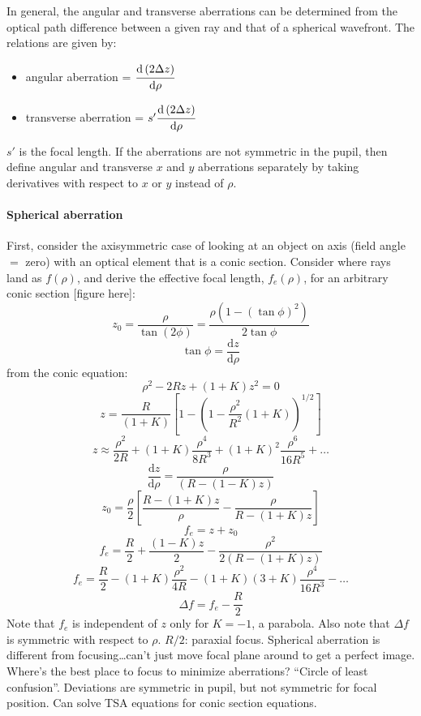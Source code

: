 \documentclass[12pt]{article}
\newcommand{\mynotes}[1]{\textcolor{myBlue}{#1}}
\begin{document}
In general, the angular and transverse aberrations can be determined
from the optical path difference between a given ray and that of a
spherical wavefront. The relations are given by:
\begin{itemize}
    \item angular aberration =
        $\cfrac{\mathrm{d} \left( 2\Delta{z} \right) }{\mathrm{d}\rho}$
    \item transverse aberration =
        $s'\cfrac{\mathrm{d} \left( 2\Delta{z} \right) }{\mathrm{d}\rho}$
\end{itemize}
$s'$ is the focal length. If the aberrations are not symmetric in the pupil,
then define angular and transverse $x$ and $y$ aberrations separately by taking
derivatives with respect to $x$ or $y$ instead of $\rho$.

\paragraph{Spherical aberration}
First, consider the axisymmetric case of looking at an object on axis
(field angle $=$ zero) with an optical element that is a conic
section. Consider where rays land as $f(\rho)$, and derive
the effective focal length, $f_{e}(\rho)$, for an arbitrary conic
section [figure here]:
\[
    z_{0} = \frac{\rho}{\tan(2\phi)} = \frac{\rho(1-(\tan\phi)^{2})}{2\tan\phi}
    \]
\[
    \tan\phi = \frac{\mathrm{d}z}{\mathrm{d}\rho}
    \]
from the conic equation:
\[
    \rho^{2} - 2Rz + (1+K)z^{2} = 0
    \]
\[
    z = \frac{R}{(1+K)} \left[ 1 - \left( 1 - \frac{\rho^{2}}{R^{2}}
    \left( 1 + K \right) \right) ^{1/2} \right]
    \]
\[
    z \approx \frac{\rho^{2}}{2R} + (1 + K)\frac{\rho^{4}}{8R^{3}} +
    (1+K)^{2}\frac{\rho^{6}}{16R^{5}} + \ldots
    \]
\[
    \frac{\mathrm{d}z}{\mathrm{d}\rho} =
    \frac{\rho}{\left(R-\left(1-K\right)z\right)}
    \]
\[
    z_{0} = \frac{\rho}{2}
    \left[\frac{R-(1+K)z}{\rho} - \frac{\rho}{R-(1+K)z}\right]
    \]
\[
    f_{e} = z + z_{0}
    \]
\[
    f_{e} = \frac{R}{2} + \frac{(1-K)z}{2} - \frac{\rho^{2}}{2(R-(1+K)z)}
    \]
\[
    f_{e} = \frac{R}{2} - (1+K)\frac{\rho^{2}}{4R} -
    (1+K)(3+K)\frac{\rho^{4}}{16R^{3}} - \ldots
    \]
\[
    \Delta{f} = f_{e} - \frac{R}{2}
    \]
Note that $f_{e}$ is independent of $z$ only for $K=-1$, a parabola.
Also note that $\Delta{f}$ is symmetric with respect to $\rho$.
\mynotes{%
    $R/2$: paraxial focus. Spherical aberration is different from
    focusing\ldots can't just move focal plane around to get a perfect image.
    Where's the best place to focus to minimize aberrations?
    ``Circle of least confusion''. Deviations are symmetric in pupil,
    but not symmetric for focal position. Can solve TSA equations for
    conic section equations.
}
\end{document}
